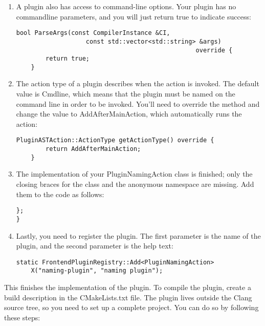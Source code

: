 \begin{enumerate}
\item A plugin also has access to command-line options. Your plugin has no commandline parameters, and you will just return true to indicate success:
\begin{lstlisting}[caption={}]
	bool ParseArgs(const CompilerInstance &CI,
				   const std::vector<std::string> &args)
												 override {
		return true;
	}
\end{lstlisting}

\item The action type of a plugin describes when the action is invoked. The default value is Cmdline, which means that the plugin must be named on the command line in order to be invoked. You'll need to override the method and change the value to AddAfterMainAction, which automatically runs the action:
\begin{lstlisting}[caption={}]
	PluginASTAction::ActionType getActionType() override {
		return AddAfterMainAction;
	}
\end{lstlisting}

\item The implementation of your PluginNamingAction class is finished; only the closing braces for the class and the anonymous namespace are missing. Add them to the code as follows:
\begin{lstlisting}[caption={}]
};
}
\end{lstlisting}

\item Lastly, you need to register the plugin. The first parameter is the name of the plugin, and the second parameter is the help text:
\begin{lstlisting}[caption={}]
static FrontendPluginRegistry::Add<PluginNamingAction>
	X("naming-plugin", "naming plugin");
\end{lstlisting}

\end{enumerate}

This finishes the implementation of the plugin. To compile the plugin, create a build description in the CMakeLists.txt file. The plugin lives outside the Clang source tree, so you need to set up a complete project. You can do so by following these steps:\par

